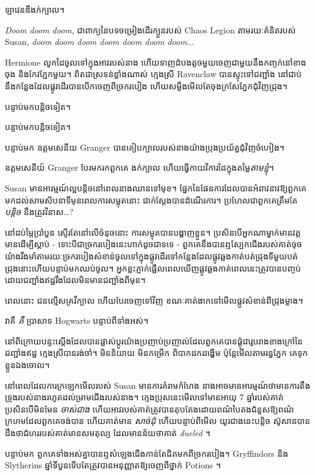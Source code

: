 {{{ឡាវេនឌឺងក់ក្បាល។

\emph{Doom doom doom,} ជាពាក្យនៃបទចម្រៀងដើរក្បួនរបស់ Chaos Legion តាមរយៈគំនិតរបស់ Susan, \emph{doom doom doom doom doom doom doom}...

Hermione លូកដៃចូលទៅក្នុងអាវរបស់នាង ហើយទាញដំបងតូចមួយចេញជាមួយនឹងកញ្ចក់នៅខាងចុង និងកែវភ្នែកមួយ។ ពិតជាស្រទន់ខ្លាំងណាស់ ក្មេងស្រី Ravenclaw បានស្ទុះទៅជញ្ជាំង នៅជាប់នឹងកន្លែងដែលផ្លូវដើរបានបើកចេញពីច្រករបៀង ហើយសម្លឹងមើលតែចុងក្រសែភ្នែកជុំវិញជ្រុង។

បន្ទាប់មកបន្តិចទៀត។

បន្ទាប់មកបន្តិចទៀត។

បន្ទាប់មក ឧត្តមសេនីយ Granger បានគៀបក្បាលរបស់នាងយ៉ាងប្រុងប្រយ័ត្នជុំវិញចំហៀង។

ឧត្តមសេនីយ៍ Granger បែរមករកពួកគេ ងក់ក្បាល ហើយធ្វើកាយវិការដៃក្នុងតម្លៃ\emph{តាមខ្ញុំ}។

Susan មាន​អារម្មណ៍​ល្អ​បន្តិច​នៅ​ពេល​នាង​ឈាន​ទៅ​មុខ។ ផ្នែកនៃផែនការដែលបានអំពាវនាវឱ្យពួកគេមកដល់សាមសិបនាទីមុនពេលការសម្លុតនោះ ជាក់ស្តែងបានដំណើរការ។ ប្រហែលជាពួកគេត្រឹមតែ\emph{បន្តិច} នឹងត្រូវវិនាស…?

\later

នៅដប់ម្ភៃប្រាំបួន ស្ទើរតែនៅលើចំនុចនោះ ការសម្លុតបានបង្ហាញខ្លួន។ ប្រសិនបើអ្នកណាម្នាក់មានវត្តមានដើម្បីស្តាប់ - ទោះបីជាច្រករបៀងនេះហាក់ដូចជាទទេ - ពួកគេនឹងបានឮស្បែកជើងរបស់គាត់ចុចយ៉ាងរឹងមាំតាមរយៈច្រករបៀងសំខាន់ចូលទៅក្នុងផ្លូវដើរទៅកន្លែងដែលផ្លូវឆ្លងកាត់បត់ជ្រុងទីមួយបត់ជ្រុងនោះហើយបន្ទាប់មកឈប់ចូល។ អ្នកខ្លះភ្ញាក់ផ្អើលពេលឃើញផ្លូវឆ្លងកាត់ពេលនេះត្រូវបានបញ្ចប់ដោយជញ្ជាំងឥដ្ឋរឹងដែលមិនមានជញ្ជាំងពីមុន។

ពេល​នោះ ជនល្មើស​គ្រវីក្បាល ហើយ​បែរ​ចេញ​ទៅ​វិញ ខណៈ​គាត់​ងាក​ទៅ​មើល​ផ្លូវ​សំខាន់​ពី​ជ្រុង​ម្ខាង។

វាគឺ \emph{គឺ} ប្រាសាទ Hogwarts បន្ទាប់ពីទាំងអស់។

នៅ​ពី​ក្រោយ​បន្ទះ​ស្តើង​ដែល​បាន​ផ្លាស់​ប្តូរ​យ៉ាង​ប្រញាប់​ប្រញាល់​ដែល​ពួក​គេ​បាន​ផ្គុំ​ជា​រូបរាង​ខាង​ក្រៅ​នៃ​ជញ្ជាំង​ឥដ្ឋ ក្មេងស្រី​បាន​រង់ចាំ។ មិននិយាយ មិនកម្រើក ពិបាកដកដង្ហើម ប៉ុន្តែមើលតាមរន្ធភ្នែក គេទុកខ្លួនឯងចោល។

នៅពេលដែលការក្រឡេកមើលរបស់ Susan មានការគំរាមកំហែង នាងអាចមានអារម្មណ៍ថាមានការតឹងទ្រូងរបស់នាងរហូតដល់ម្រាមជើងរបស់នាង។ ក្មេងប្រុសនេះមើលទៅមានអាយុ 7 ឆ្នាំរបស់គាត់ ប្រសិនបើមិនមែន \emph{ចាស់ជាង} ហើយអាវរបស់គាត់ត្រូវបានតុបតែងដោយពណ៌បៃតងជំនួសឱ្យពណ៌ក្រហមដែលពួកគេចង់បាន ហើយគាត់មាន \emph{សាច់ដុំ} ហើយបន្ទាប់ពីមើល យូរជាងនេះបន្តិច ស៊ូសានបានដឹងថាជំហររបស់គាត់មានសមតុល្យ ដែលមានន័យថាគាត់ \emph{dueled} ។

បន្ទាប់​មក ពួកគេ​ទាំង​អស់​គ្នា​បាន​ឮ​សំឡេង​ជើង​កាន់​តែ​ជិត​មក​ពី​ច្រក​របៀង។ Gryffindors និង Slytherins ឆ្នាំទីបួនទើបតែត្រូវបានអនុញ្ញាតឱ្យចេញពីថ្នាក់ Potions ។

}}}
